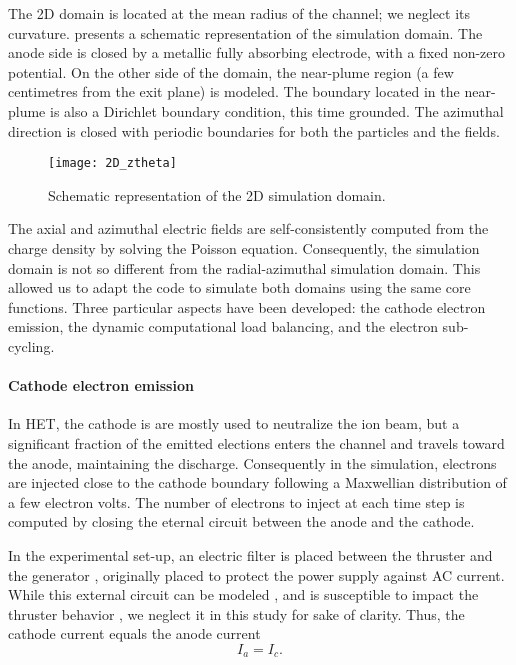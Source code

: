 The \ac{2D} \ztheta domain is located at the mean radius of the channel\string; we neglect its curvature.
 presents a schematic representation of the \ztheta simulation domain.
The anode side is closed by a metallic fully absorbing electrode, with a fixed non-zero potential.
On the other side of the domain, the near-plume region (a few centimetres from the exit plane) is modeled.
The boundary located in the near-plume is also a Dirichlet boundary condition, this time grounded.
The azimuthal direction is closed with periodic boundaries for both the particles and the fields.

\begin{figure}[hbt]
  \centering
  \texttt{[image: 2D\_ztheta]}
  \caption{Schematic representation of the \ac{2D} \ztheta simulation domain.}
  \label{fig-2D_ztheta_bis}
\end{figure}

The axial and azimuthal electric fields are self-consistently computed from the charge density by solving the Poisson equation.
Consequently, the simulation domain is not so different from the radial-azimuthal simulation domain.
This allowed us to adapt the code \LPPic to simulate both domains using the same core functions.
Three particular aspects have been developed\string: the cathode electron emission, the dynamic computational load balancing, and the electron sub-cycling.

\paragraph{Cathode electron emission\\}
In \ac{HET},  the cathode is are mostly used to neutralize the ion beam, but a significant fraction of the emitted elections enters the channel and travels toward the anode, maintaining the discharge.
Consequently in the simulation, electrons are injected close to the cathode boundary following a Maxwellian distribution of a few electron volts.
The number of electrons to inject at each time step is computed by closing the eternal circuit between the anode and the cathode.

In the experimental set-up, an electric filter is placed between the thruster and the generator \citep{barral2008}, originally placed to protect the power supply against AC current.
While this external circuit can be modeled \citep{verboncoeur1993}, and is susceptible to impact the thruster behavior \citep{barral2008,wei2017}, we neglect it in this study for sake of clarity.
Thus, the cathode current equals the anode current \[ I_a = I_c. \]

